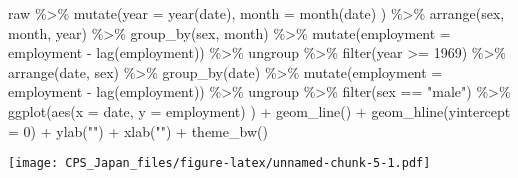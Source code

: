 \documentclass[
]{book}
\newenvironment{Shaded}{\begin{snugshade}}{\end{snugshade}}
\newcommand{\AttributeTok}[1]{\textcolor[rgb]{0.77,0.63,0.00}{#1}}
\newcommand{\DecValTok}[1]{\textcolor[rgb]{0.00,0.00,0.81}{#1}}
\newcommand{\FunctionTok}[1]{\textcolor[rgb]{0.00,0.00,0.00}{#1}}
\newcommand{\NormalTok}[1]{#1}
\newcommand{\SpecialCharTok}[1]{\textcolor[rgb]{0.00,0.00,0.00}{#1}}
\newcommand{\StringTok}[1]{\textcolor[rgb]{0.31,0.60,0.02}{#1}}
\begin{document}
\begin{Shaded}
\begin{Highlighting}[]
\NormalTok{raw }\SpecialCharTok{\%\textgreater{}\%}
  \FunctionTok{mutate}\NormalTok{(}\AttributeTok{year =} \FunctionTok{year}\NormalTok{(date),}
         \AttributeTok{month =} \FunctionTok{month}\NormalTok{(date)}
\NormalTok{         ) }\SpecialCharTok{\%\textgreater{}\%}
  \FunctionTok{arrange}\NormalTok{(sex,}
\NormalTok{          month,}
\NormalTok{          year) }\SpecialCharTok{\%\textgreater{}\%}
  \FunctionTok{group\_by}\NormalTok{(sex,}
\NormalTok{           month) }\SpecialCharTok{\%\textgreater{}\%}
  \FunctionTok{mutate}\NormalTok{(}\AttributeTok{employment =}\NormalTok{ employment }\SpecialCharTok{{-}} \FunctionTok{lag}\NormalTok{(employment)) }\SpecialCharTok{\%\textgreater{}\%}
\NormalTok{  ungroup }\SpecialCharTok{\%\textgreater{}\%}
  \FunctionTok{filter}\NormalTok{(year }\SpecialCharTok{\textgreater{}=} \DecValTok{1969}\NormalTok{) }\SpecialCharTok{\%\textgreater{}\%}
  \FunctionTok{arrange}\NormalTok{(date,}
\NormalTok{          sex) }\SpecialCharTok{\%\textgreater{}\%}
  \FunctionTok{group\_by}\NormalTok{(date) }\SpecialCharTok{\%\textgreater{}\%}
  \FunctionTok{mutate}\NormalTok{(}\AttributeTok{employment =}\NormalTok{ employment }\SpecialCharTok{{-}} \FunctionTok{lag}\NormalTok{(employment)) }\SpecialCharTok{\%\textgreater{}\%}
\NormalTok{  ungroup }\SpecialCharTok{\%\textgreater{}\%}
  \FunctionTok{filter}\NormalTok{(sex }\SpecialCharTok{==} \StringTok{"male"}\NormalTok{) }\SpecialCharTok{\%\textgreater{}\%}
  \FunctionTok{ggplot}\NormalTok{(}\FunctionTok{aes}\NormalTok{(}\AttributeTok{x =}\NormalTok{ date,}
             \AttributeTok{y =}\NormalTok{ employment)}
\NormalTok{         ) }\SpecialCharTok{+}
  \FunctionTok{geom\_line}\NormalTok{() }\SpecialCharTok{+}
  \FunctionTok{geom\_hline}\NormalTok{(}\AttributeTok{yintercept =} \DecValTok{0}\NormalTok{) }\SpecialCharTok{+}
  \FunctionTok{ylab}\NormalTok{(}\StringTok{""}\NormalTok{) }\SpecialCharTok{+}
  \FunctionTok{xlab}\NormalTok{(}\StringTok{""}\NormalTok{) }\SpecialCharTok{+}
  \FunctionTok{theme\_bw}\NormalTok{()}
\end{Highlighting}
\end{Shaded}

\texttt{[image: CPS\_Japan\_files/figure-latex/unnamed-chunk-5-1.pdf]}

  
\end{document}
